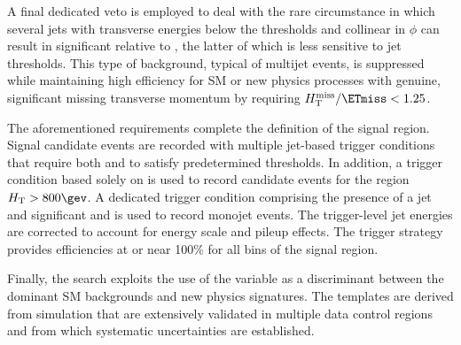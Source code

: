 A final dedicated veto is employed to deal with the rare circumstance
in which several jets with transverse energies below the \Et
thresholds and collinear in $\phi$ can result in significant \mht
relative to \ETmiss, the latter of which is less sensitive to jet
thresholds. This type of background, typical of multijet events, is
suppressed while maintaining high efficiency for SM or new physics
processes with genuine, significant missing transverse momentum by
requiring $\mht / \ETmiss < 1.25$. 

The aforementioned requirements complete the definition of the signal
region. Signal candidate events are recorded with multiple jet-based
trigger conditions that require both \scalht and \alphat to satisfy
predetermined thresholds. In addition, a trigger condition based
solely on \scalht is used to record candidate events for
the region $\scalht > 800\gev$. A dedicated trigger condition
comprising the presence of a jet and significant \mht and \ETmiss is
used to record monojet events. The trigger-level jet energies are
corrected to account for energy scale and pileup effects. The trigger
strategy provides efficiencies at or near 100\% for all bins of the
signal region.

Finally, the search exploits the use of the \mht variable as a
discriminant between the dominant SM backgrounds and new physics
signatures. The \mht templates are derived from simulation that are
extensively validated in multiple data control regions and from which
systematic uncertainties are established.
